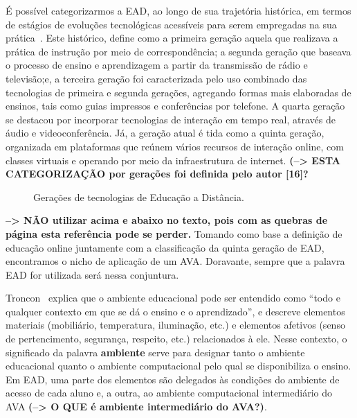 É possível categorizarmos a EAD, ao longo de sua trajetória histórica, em termos de estágios de evoluções tecnológicas acessíveis para serem empregadas na sua prática~\cite{dotta@ead}. Este histórico, define como a  primeira geração aquela que realizava a prática de instrução por meio de correspondência; a segunda geração que baseava o processo de ensino e aprendizagem a partir da transmissão de rádio e televisão;e, a terceira geração foi caracterizada pelo uso combinado das tecnologias de primeira e segunda gerações, agregando formas mais elaboradas de ensinos, tais como guias impressos e conferências por telefone. A quarta geração se destacou por incorporar tecnologias de interação em tempo real, através de áudio e videoconferência. Já, a geração atual é tida como a quinta geração, organizada em plataformas que reúnem vários recursos de interação online, com classes virtuais e operando por meio da infraestrutura de internet. \textbf{(--> ESTA CATEGORIZAÇÃO por gerações foi definida pelo autor [16]?}
\begin{figure}[h]
    \centering
    \caption{Gerações de tecnologias de Educação a Distância.}
    \label{fig:geracao}
\end{figure}      
  
  \textbf{--> NÃO utilizar acima e abaixo no texto, pois com as quebras de página esta referência pode se perder.}
Tomando como base a definição de educação online juntamente com a classificação da quinta geração de EAD, encontramos o nicho de aplicação de um \acrlong{AVA}. Doravante, sempre que a palavra EAD for utilizada será nessa conjuntura.

Troncon~\cite{RMRP86614} explica que o ambiente educacional pode ser entendido como ``todo e qualquer contexto em que se dá o ensino e o aprendizado'', e descreve elementos materiais (mobiliário, temperatura, iluminação, etc.) e elementos afetivos (senso de pertencimento, segurança, respeito, etc.) relacionados à ele. Nesse contexto, o significado da palavra \textbf{ambiente} serve para designar tanto o ambiente educacional quanto o ambiente computacional pelo qual se disponibiliza o ensino. Em EAD, uma parte dos elementos são delegados às condições do ambiente de acesso de cada aluno e, a outra, ao ambiente computacional intermediário do AVA\textbf{ (--> O QUE é ambiente intermediário do AVA?)}. 

